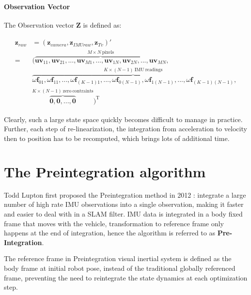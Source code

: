 \documentclass[12pt]{report}   %
\begin{document}
\paragraph{Observation Vector}
The Observation vector $\textbf{Z}$ is defined as:

\begin{align*}
\begin{split}
\textbf{z}_{raw} &= (\textbf{z}_{camera}, \textbf{z}_{IMUraw}, \textbf{z}_{Tv})' \nonumber \\
=& (\overbrace{\textbf{uv}_{11}, \textbf{uv}_{21}, ... , \textbf{uv}_{M1}, ..., \textbf{uv}_{1N}, \textbf{uv}_{2N}, ... , \textbf{uv}_{MN}}^{M \times N \ {\mathrm{pixels}}}, \nonumber \\ 
& \overbrace{\omega\textbf{f}_{01}, \omega\textbf{f}_{11}, ... , \omega\textbf{f}_{(K-1)1}, ..., \omega\textbf{f}_{0(N-1)}, \omega\textbf{f}_{1(N-1)}, ... , \omega\textbf{f}_{(K-1)(N-1)}}^{K \times (N-1) \ {\mathrm{IMU \ readings}}}, \\
& \overbrace{\textbf{0}, \textbf{0}, ... , \textbf{0}}^{K \times (N-1)  \ {\mathrm{ zero \ contraints}}})^{\mathrm{T}}
\end{split}
\end{align*}

Clearly, such a large state space quickly becomes difficult to manage in
practice. Further, each step of re-linearization, the integration from
acceleration to velocity then to position has to be recomputed, which brings
lots of additional time.

\section{The Preintegration algorithm}

Todd Lupton first proposed the Preintegration method in 2012 \cite{Lupton2012}:
integrate a large number of high rate IMU observations into a single
observation, making it faster and easier to deal with in a SLAM filter. IMU data
is integrated in a body fixed frame that moves with the vehicle, transformation
to reference frame only happens at the end of integration, hence the algorithm
is referred to as \textbf{Pre-Integration}.

The reference frame in Preintegration visual inertial system is defined as the
body frame at initial robot pose, instead of the traditional globally referenced
frame, preventing the need to reintegrate the state dynamics at each
optimization step.
\end{document}
